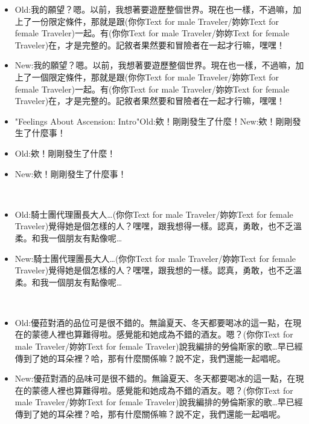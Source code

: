 \documentclass[a4paper,12pt]{article}
\begin{document}
\begin{itemize}
\item Old:我的願望？嗯。以前，我想著要遊歷整個世界。現在也一樣，不過嘛，加上了一份限定條件，那就是跟(‍你你Text for male Traveler/妳妳Text for female Traveler‍)一起。有(‍你你Text for male Traveler/妳妳Text for female Traveler‍)在，才是完整的。記敘者果然要和冒險者在一起才行嘛，嘿嘿！
\item New:我的願望？嗯。以前，我想著要遊歷整個世界。現在也一樣，不過嘛，加上了一個限定條件，那就是跟(‍你你Text for male Traveler/妳妳Text for female Traveler‍)一起。有(‍你你Text for male Traveler/妳妳Text for female Traveler‍)在，才是完整的。記敘者果然要和冒險者在一起才行嘛，嘿嘿！
\item "Feelings About Ascension: Intro"Old:欸！剛剛發生了什麼！New:欸！剛剛發生了什麼事！
\item Old:欸！剛剛發生了什麼！
\item New:欸！剛剛發生了什麼事！
\end{itemize}\\ \par \vspace{0.5cm}

\begin{itemize}
\item Old:騎士團代理團長大人…(‍你你Text for male Traveler/妳妳Text for female Traveler‍)覺得她是個怎樣的人？嘿嘿，跟我想得一樣。認真，勇敢，也不乏溫柔。和我一個朋友有點像呢…
\item New:騎士團代理團長大人…(‍你你Text for male Traveler/妳妳Text for female Traveler‍)覺得她是個怎樣的人？嘿嘿，跟我想的一樣。認真，勇敢，也不乏溫柔。和我一個朋友有點像呢…
\end{itemize}\\ \par \vspace{0.5cm}

\begin{itemize}
\item Old:優菈對酒的品位可是很不錯的。無論夏天、冬天都要喝冰的這一點，在現在的蒙德人裡也算難得啦。感覺能和她成為不錯的酒友。嗯？(‍你你Text for male Traveler/妳妳Text for female Traveler‍)說我編排的勞倫斯家的歌…早已經傳到了她的耳朵裡？哈，那有什麼關係嘛？說不定，我們還能一起唱呢。
\item New:優菈對酒的品味可是很不錯的。無論夏天、冬天都要喝冰的這一點，在現在的蒙德人裡也算難得啦。感覺能和她成為不錯的酒友。嗯？(‍你你Text for male Traveler/妳妳Text for female Traveler‍)說我編排的勞倫斯家的歌…早已經傳到了她的耳朵裡？哈，那有什麼關係嘛？說不定，我們還能一起唱呢。
\end{itemize}\\ \par \vspace{0.5cm}
\end{document}
